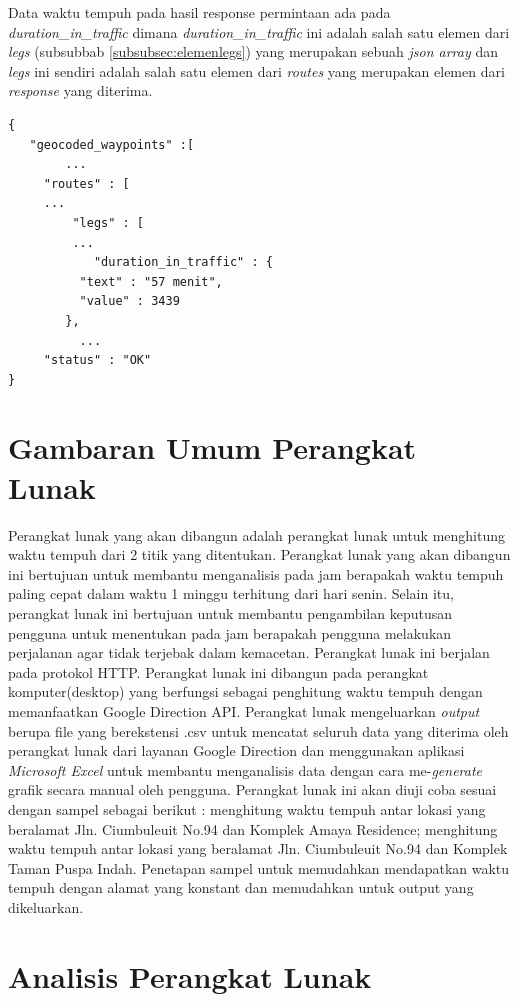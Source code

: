 Data waktu tempuh pada hasil response permintaan ada pada \textit{duration\_in\_traffic} dimana \textit{duration\_in\_traffic} ini adalah salah satu elemen dari \textit{legs} (subsubbab \ref{subsubsec:elemenlegs}) yang merupakan sebuah \textit{json array} dan \textit{legs} ini sendiri adalah salah satu elemen dari \textit{routes} yang merupakan elemen dari \textit{response} yang diterima.

\begin{lstlisting}[caption= Hasil \textit{response} Google Directions, captionpos=b]
{
   "geocoded_waypoints" :[
		...
	 "routes" : [
	 ...
		 "legs" : [
		 ...
			"duration_in_traffic" : {
          "text" : "57 menit",
          "value" : 3439
	    },
		  ...
	 "status" : "OK"
}
\end{lstlisting}


\section{Gambaran Umum Perangkat Lunak}
\label{sec:gambaranumum}

Perangkat lunak yang akan dibangun adalah perangkat lunak untuk menghitung waktu tempuh dari 2 titik yang ditentukan. Perangkat lunak yang akan dibangun ini bertujuan untuk membantu menganalisis pada jam berapakah waktu tempuh paling cepat dalam waktu 1 minggu terhitung dari hari senin. Selain itu, perangkat lunak ini bertujuan untuk membantu pengambilan keputusan pengguna untuk menentukan pada jam berapakah pengguna melakukan perjalanan agar tidak terjebak dalam kemacetan. Perangkat lunak ini berjalan pada protokol HTTP. Perangkat lunak ini dibangun pada perangkat komputer(desktop) yang berfungsi sebagai penghitung waktu tempuh dengan memanfaatkan Google Direction API. Perangkat lunak mengeluarkan \textit{output} berupa file yang berekstensi .csv untuk mencatat seluruh data yang diterima oleh perangkat lunak dari layanan Google Direction dan menggunakan aplikasi \textit{Microsoft Excel} untuk membantu menganalisis data dengan cara me-\textit{generate} grafik secara manual oleh pengguna.
Perangkat lunak ini akan diuji coba sesuai dengan sampel sebagai berikut : menghitung  waktu tempuh antar lokasi yang beralamat Jln. Ciumbuleuit No.94 dan Komplek Amaya Residence; menghitung  waktu tempuh antar lokasi yang beralamat Jln. Ciumbuleuit No.94 dan Komplek Taman Puspa Indah. Penetapan sampel untuk memudahkan mendapatkan waktu tempuh dengan alamat yang konstant dan memudahkan untuk output yang dikeluarkan.
						
\section{Analisis Perangkat Lunak}
\label{sec:analisispl}

